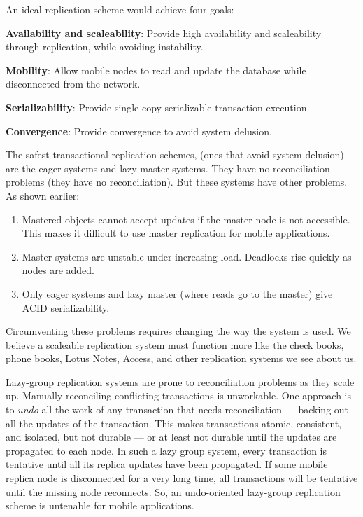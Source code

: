\documentclass[a4paper,11pt,twoside,openright]{article}
\begin{document}
An ideal replication scheme would achieve four goals:

\textbf{Availability and scaleability}: Provide high availability and
scaleability through replication, while avoiding instability.

\textbf{Mobility}: Allow mobile nodes to read and update the database
while disconnected from the network.

\textbf{Serializability}: Provide single-copy serializable transaction
execution.

\textbf{Convergence}: Provide convergence to avoid system delusion.

The safest transactional replication schemes, (ones that avoid system
delusion) are the eager systems and lazy master systems. They have no
reconciliation problems (they have no reconciliation). But these systems
have other problems. As shown earlier:

\begin{enumerate}
\def\labelenumi{\arabic{enumi}.}
\item
  Mastered objects cannot accept updates if the master node is not
  accessible. This makes it difficult to use master replication for
  mobile applications.
\item
  Master systems are unstable under increasing load. Deadlocks rise
  quickly as nodes are added.
\item
  Only eager systems and lazy master (where reads go to the master) give
  ACID serializability.
\end{enumerate}

Circumventing these problems requires changing the way the system is
used. We believe a scaleable replication system must function more like
the check books, phone books, Lotus Notes, Access, and other replication
systems we see about us.

Lazy-group replication systems are prone to reconciliation problems as
they scale up. Manually reconciling conflicting transactions is
unworkable. One approach is to \emph{undo} all the work of any
transaction that needs reconciliation --- backing out all the updates of
the transaction. This makes transactions atomic, consistent, and
isolated, but not durable --- or at least not durable until the updates
are propagated to each node. In such a lazy group system, every
transaction is tentative until all its replica updates have been
propagated. If some mobile replica node is disconnected for a very long
time, all transactions will be tentative until the missing node
reconnects. So, an undo-oriented lazy-group replication scheme is
untenable for mobile applications.
\end{document}
